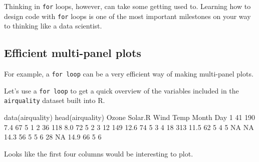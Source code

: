 \documentclass[
]{book}
\newenvironment{Shaded}{\begin{snugshade}}{\end{snugshade}}
\newcommand{\ConstantTok}[1]{\textcolor[rgb]{0.00,0.00,0.00}{#1}}
\newcommand{\DecValTok}[1]{\textcolor[rgb]{0.00,0.00,0.81}{#1}}
\newcommand{\FloatTok}[1]{\textcolor[rgb]{0.00,0.00,0.81}{#1}}
\newcommand{\FunctionTok}[1]{\textcolor[rgb]{0.00,0.00,0.00}{#1}}
\newcommand{\NormalTok}[1]{#1}
\begin{document}
Thinking in \texttt{for} loops, however, can take some getting used to. Learning how to design code with \texttt{for} loops is one of the most important milestones on your way to thinking like a data scientist.

\hypertarget{efficient-multi-panel-plots}{%
\subsection*{Efficient multi-panel plots}\label{efficient-multi-panel-plots}}

For example, a \texttt{for\ loop} can be a very efficient way of making multi-panel plots.

Let's use a \texttt{for\ loop} to get a quick overview of the variables included in the \texttt{airquality} dataset built into R.

\begin{Shaded}
\begin{Highlighting}[]
\FunctionTok{data}\NormalTok{(airquality)}
\FunctionTok{head}\NormalTok{(airquality)}
\NormalTok{  Ozone Solar.R Wind Temp Month Day}
\DecValTok{1}    \DecValTok{41}     \DecValTok{190}  \FloatTok{7.4}   \DecValTok{67}     \DecValTok{5}   \DecValTok{1}
\DecValTok{2}    \DecValTok{36}     \DecValTok{118}  \FloatTok{8.0}   \DecValTok{72}     \DecValTok{5}   \DecValTok{2}
\DecValTok{3}    \DecValTok{12}     \DecValTok{149} \FloatTok{12.6}   \DecValTok{74}     \DecValTok{5}   \DecValTok{3}
\DecValTok{4}    \DecValTok{18}     \DecValTok{313} \FloatTok{11.5}   \DecValTok{62}     \DecValTok{5}   \DecValTok{4}
\DecValTok{5}    \ConstantTok{NA}      \ConstantTok{NA} \FloatTok{14.3}   \DecValTok{56}     \DecValTok{5}   \DecValTok{5}
\DecValTok{6}    \DecValTok{28}      \ConstantTok{NA} \FloatTok{14.9}   \DecValTok{66}     \DecValTok{5}   \DecValTok{6}
\end{Highlighting}
\end{Shaded}

Looks like the first four columns would be interesting to plot.
\end{document}
